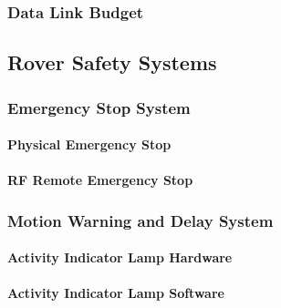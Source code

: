 \subsubsection{Data Link Budget}
\label{subsubsec:data_link_budget}


\subsection{Rover Safety Systems}
\label{subsec:rover_safety_systems}

\subsubsection{Emergency Stop System}
\label{subsubsec:emergency_stop_system}

\paragraph{Physical Emergency Stop}
\label{par:physical_emergency_stop}


\paragraph{RF Remote Emergency Stop}
\label{par:rf_remote_emergency_stop}


\subsubsection{Motion Warning and Delay System}
\label{subsubsec:motion_warning_delay_system}

\paragraph{Activity Indicator Lamp Hardware}
\label{par:activity_indicator_lamp_hardware}


\paragraph{Activity Indicator Lamp Software}
\label{par:activity_indicator_lamp_software}


